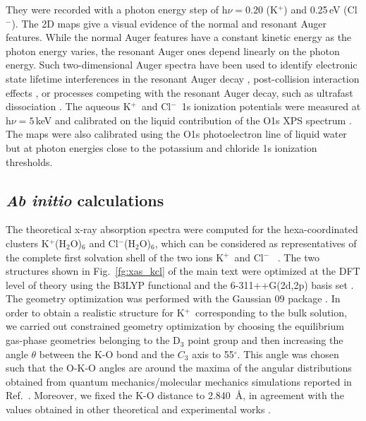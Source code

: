 \documentclass[journal=jpclcd,manuscript=letter]{achemso}
\newcommand{\cli}{Cl$^{-}$}
\newcommand{\ki}{K$^{+}$}
\begin{document}
{\color{red}They were recorded with a photon energy step of h$\nu = 0.20$ (\ki) and 0.25\,eV (\cli). The 2D maps give a visual evidence of the normal and resonant Auger features. While the normal Auger features have a constant kinetic energy as the photon energy varies, the resonant Auger ones depend linearly on the photon energy. Such two-dimensional Auger spectra have been used to identify electronic state lifetime interferences in the resonant Auger decay \citep{ceolin15:022502,goldsz16:15133}, post-collision interaction effects \citep{guillemin15:012503}, or processes competing with the resonant Auger decay, such as ultrafast dissociation \citep{piancastelli13:2035}.} The aqueous K$^{+}$~and Cl$^{-}$~1s ionization potentials were measured at h$\nu = 5$\,keV and calibrated on the liquid contribution of the O1s XPS spectrum \cite{winter06:1176}. The maps were also calibrated using the O1s photoelectron line of liquid water but at photon energies close to the potassium and chloride 1s ionization thresholds.


\subsection{{\bf{\it Ab initio}} calculations}

The theoretical x-ray absorption spectra were computed for the hexa-coordinated clusters K$^{+}$(H$_2$O)$_6$ and Cl$^{-}$(H$_2$O)$_6$, which can be considered as representatives of the complete first solvation shell of the two ions \ki~and \cli~ \citep{Ohtaki93:1157,soper06:180,ma14:1006}. The two structures shown in Fig.\ \ref{fg:xas_kcl} of the main text were optimized at the DFT level of theory using the B3LYP functional and the 6-311++G(2d,2p) basis set \citep{Krishnan80:650,Blaudeau97:5016}. The geometry optimization was performed with the Gaussian 09 package \citep{g09}. In order to obtain a realistic structure for K$^{+}$~corresponding to the bulk solution, we carried out constrained geometry optimization by choosing the equilibrium gas-phase geometries \citep{lee99:3995,lee02:5509} belonging to the D$_3$ point group and then increasing the angle $\theta$ between the K-O bond and the $C_3$ axis to 55$^{\circ}$. This angle was chosen such that the O-K-O angles are around the maxima of the angular distributions obtained from quantum mechanics/molecular mechanics simulations reported in Ref.\ \citep{ma14:1006}. Moreover, we fixed the K-O distance to 2.840~\AA, in agreement with the values obtained in other theoretical and experimental works \citep{Ohtaki93:1157,soper06:180,ma14:1006}.
\end{document}
